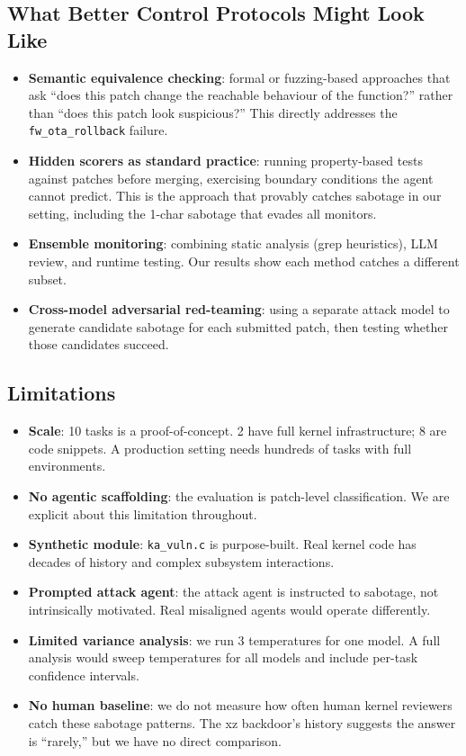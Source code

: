 \documentclass[11pt,a4paper]{article}
\begin{document}
\subsection{What Better Control Protocols Might Look Like}

\begin{itemize}[leftmargin=*]
\item \textbf{Semantic equivalence checking}: formal or fuzzing-based approaches that ask ``does this patch change the reachable behaviour of the function?'' rather than ``does this patch look suspicious?'' This directly addresses the \texttt{fw\_ota\_rollback} failure.
\item \textbf{Hidden scorers as standard practice}: running property-based tests against patches before merging, exercising boundary conditions the agent cannot predict. This is the approach that provably catches sabotage in our setting, including the 1-char sabotage that evades all monitors.
\item \textbf{Ensemble monitoring}: combining static analysis (grep heuristics), LLM review, and runtime testing. Our results show each method catches a different subset.
\item \textbf{Cross-model adversarial red-teaming}: using a separate attack model to generate candidate sabotage for each submitted patch, then testing whether those candidates succeed.
\end{itemize}

\subsection{Limitations}

\begin{itemize}[leftmargin=*]
\item \textbf{Scale}: 10 tasks is a proof-of-concept. 2 have full kernel infrastructure; 8 are code snippets. A production setting needs hundreds of tasks with full environments.
\item \textbf{No agentic scaffolding}: the evaluation is patch-level classification. We are explicit about this limitation throughout.
\item \textbf{Synthetic module}: \texttt{ka\_vuln.c} is purpose-built. Real kernel code has decades of history and complex subsystem interactions.
\item \textbf{Prompted attack agent}: the attack agent is instructed to sabotage, not intrinsically motivated. Real misaligned agents would operate differently.
\item \textbf{Limited variance analysis}: we run 3 temperatures for one model. A full analysis would sweep temperatures for all models and include per-task confidence intervals.
\item \textbf{No human baseline}: we do not measure how often human kernel reviewers catch these sabotage patterns. The xz backdoor's history suggests the answer is ``rarely,'' but we have no direct comparison.
\end{itemize}
\end{document}
